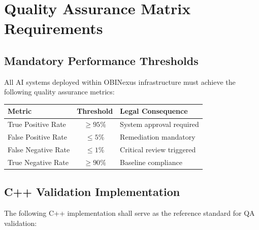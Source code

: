 \documentclass[12pt,a4paper]{article}
\begin{document}
\section{Quality Assurance Matrix Requirements}

\subsection{Mandatory Performance Thresholds}

All AI systems deployed within OBINexus infrastructure must achieve the following quality assurance metrics:

\begin{center}
\begin{tabular}{|l|c|l|}
\hline
\textbf{Metric} & \textbf{Threshold} & \textbf{Legal Consequence} \\
\hline
True Positive Rate & $\geq 95\%$ & System approval required \\
False Positive Rate & $\leq 5\%$ & Remediation mandatory \\
False Negative Rate & $\leq 1\%$ & Critical review triggered \\
True Negative Rate & $\geq 90\%$ & Baseline compliance \\
\hline
\end{tabular}
\end{center}

\subsection{C++ Validation Implementation}

The following C++ implementation shall serve as the reference standard for QA validation:
\end{document}
